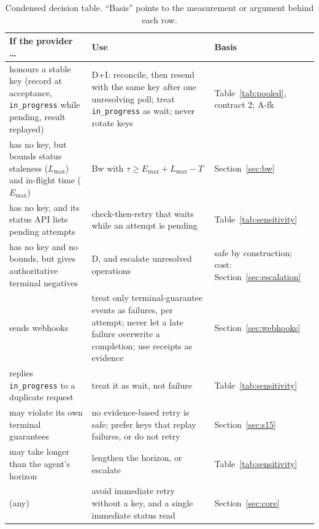 \documentclass[11pt]{article}
\newcommand{\code}[1]{\texttt{#1}}
\begin{document}
\begin{table}[!htbp]
\centering
\footnotesize
\caption{Condensed decision table. ``Basis'' points to the measurement or argument behind each row.}
\label{tab:decision}
\begin{tabular}{@{}L{5.2cm}L{6.8cm}L{3.4cm}@{}}
\toprule
If the provider \ldots & Use & Basis \\
\midrule
honours a stable key (record at acceptance, \code{in\_progress} while pending, result replayed) & D+I: reconcile, then resend with the same key after one unresolving poll; treat \code{in\_progress} as wait; never rotate keys & Table~\ref{tab:pooled}, contract 2; A-fk \\
has no key, but bounds status staleness ($L_{\max}$) and in-flight time ($E_{\max}$) & Bw with $\tau \geq E_{\max} + L_{\max} - T$ & Section~\ref{sec:bw} \\
has no key, and its status API lists pending attempts & check-then-retry that waits while an attempt is pending & Table~\ref{tab:sensitivity} \\
has no key and no bounds, but gives authoritative terminal negatives & D, and escalate unresolved operations & safe by construction; cost: Section~\ref{sec:escalation} \\
sends webhooks & treat only terminal-guarantee events as failures, per attempt; never let a late failure overwrite a completion; use receipts as evidence & Section~\ref{sec:webhooks} \\
replies \code{in\_progress} to a duplicate request & treat it as wait, not failure & Table~\ref{tab:sensitivity} \\
may violate its own terminal guarantees & no evidence-based retry is safe; prefer keys that replay failures, or do not retry & Section~\ref{sec:s15} \\
may take longer than the agent's horizon & lengthen the horizon, or escalate & Table~\ref{tab:sensitivity} \\
(any) & avoid immediate retry without a key, and a single immediate status read & Section~\ref{sec:core} \\
\bottomrule
\end{tabular}
\end{table}
\end{document}
